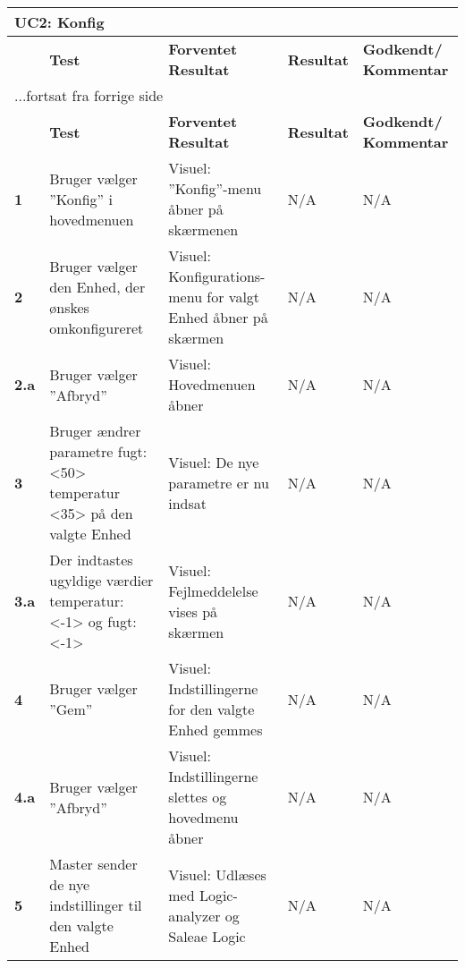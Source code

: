 \begin{center}
\begin{longtable}{|p{}|p{}|p{}|p{}|p{}|} %
\hline
\multicolumn{5}{|l|}{\textbf{UC2: Konfig}} \\ \hline
\multicolumn{1}{|c|}{} &
\textbf{Test} &
\textbf{Forventet \newline Resultat} &
\textbf{Resultat} &
\textbf{Godkendt/ \newline Kommentar} \\ \hline 
\endfirsthead

\multicolumn{5}{l}{...fortsat fra forrige side} \\ \hline 
\multicolumn{1}{|c|}{} &
\textbf{Test} &
\textbf{Forventet \newline Resultat} &
\textbf{Resultat} &
\textbf{Godkendt/ \newline Kommentar} \\ \hline 
\endhead

\textbf{1}	&Bruger vælger ''Konfig'' i hovedmenuen
			&Visuel: ''Konfig''-menu åbner på skærmenen
			&N/A 
			&N/A \\ \hline 
			
\textbf{2}	&Bruger vælger den Enhed, der ønskes omkonfigureret
			&Visuel: Konfigurations-menu for valgt Enhed åbner på skærmen
			&N/A
			&N/A \\ \hline 
			
\textbf{2.a}	&Bruger vælger ''Afbryd''
			&Visuel: Hovedmenuen åbner
			&N/A
			&N/A \\ \hline 
			
\textbf{3}	&Bruger ændrer parametre fugt: <50> temperatur <35> på den valgte Enhed 
			&Visuel: De nye parametre er nu indsat
			&N/A
			&N/A \\ \hline 

\textbf{3.a}	&Der indtastes ugyldige værdier temperatur: <-1> og fugt: <-1>
			&Visuel: Fejlmeddelelse vises på skærmen
			&N/A
			&N/A \\ \hline 
			
\textbf{4}	&Bruger vælger ''Gem'' 
			&Visuel: Indstillingerne for den valgte Enhed gemmes
			&N/A
			&N/A \\ \hline 
			
\textbf{4.a}	&Bruger vælger ''Afbryd''
			&Visuel: Indstillingerne slettes og hovedmenu åbner
			&N/A
			&N/A \\ \hline 
			
\textbf{5}	&Master sender de nye indstillinger til den valgte Enhed
			&Visuel: Udlæses med Logic-analyzer og Saleae Logic
			&N/A
			&N/A \\ \hline 
			
\end{longtable}
	\label{ATUC2} 
\end{center}